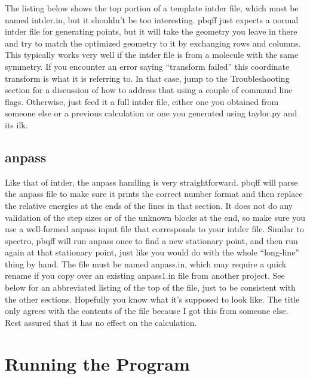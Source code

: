 \documentclass{article}
\begin{document}
The listing below shows the top portion of a template intder file,
which must be named intder.in, but it shouldn't be too
interesting. pbqff just expects a normal intder file for generating
points, but it will take the geometry you leave in there and try to
match the optimized geometry to it by exchanging rows and
columns. This typically works very well if the intder file is from a
molecule with the same symmetry. If you encounter an error saying
``transform failed'' this coordinate transform is what it is referring
to. In that case, jump to the Troubleshooting section for a discussion
of how to address that using a couple of command line
flags. Otherwise, just feed it a full intder file, either one you
obtained from someone else or a previous calculation or one you
generated using taylor.py and its ilk.

{\tiny

}

\subsection{anpass}

Like that of intder, the anpass handling is very
straightforward. pbqff will parse the anpass file to make sure it
prints the correct number format and then replace the relative
energies at the ends of the lines in that section. It does not do any
validation of the step sizes or of the unknown blocks at the end, so
make sure you use a well-formed anpass input file that corresponds to
your intder file. Similar to spectro, pbqff will run anpass once to
find a new stationary point, and then run again at that stationary
point, just like you would do with the whole ``long-line'' thing by
hand. The file must be named anpass.in, which may require a quick
rename if you copy over an existing anpass1.in file from another
project. See below for an abbreviated listing of the top of the file,
just to be consistent with the other sections. Hopefully you know what
it's supposed to look like. The title only agrees with the contents of
the file because I got this from someone else. Rest assured that it
has no effect on the calculation.



\section{Running the Program}
\end{document}
